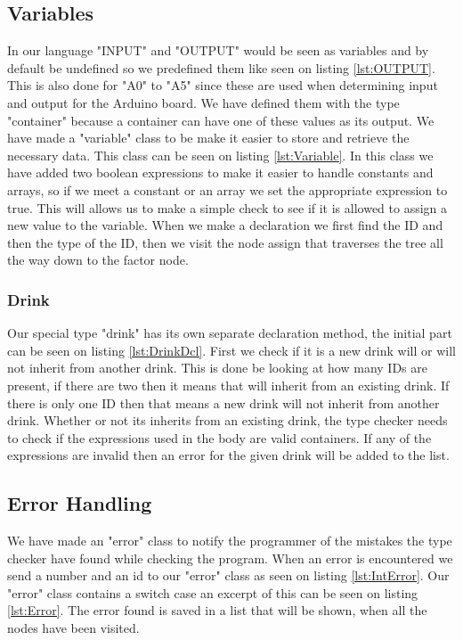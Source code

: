 \subsection*{Variables}
In our language "INPUT" and "OUTPUT" would be seen as variables and by default be undefined so we predefined them like seen on listing \ref{lst:OUTPUT}. This is also done for "A0" to "A5" since these are used when determining input and output for the Arduino board. We have defined them with the type "container" because a container can have one of these values as its output.
We have made a "variable" class to be make it easier to store and retrieve the necessary data. This class can be seen on listing \ref{lst:Variable}. In this class we have added two boolean expressions to make it easier to handle constants and arrays, so if we meet a constant or an array we set the appropriate expression to true. This will allows us to make a simple check to see if it is allowed to assign a new value to the variable.
When we make a declaration we first find the ID and then the type of the ID, then we visit the node assign that traverses the tree all the way down to the factor node.

\subsubsection*{Drink}
Our special type "drink" has its own separate declaration method, the initial part can be seen on listing \ref{lst:DrinkDcl}. First we check if it is a new drink will or will not inherit from another drink. This is done be looking at how many IDs are present, if there are two then it means that will inherit from an existing drink. If there is only one ID then that means a new drink will not inherit from another drink.
Whether or not its inherits from an existing drink, the type checker needs to check if the expressions used in the body are valid containers. If any of the expressions are invalid then an error for the given drink will be added to the list.

\subsection*{Error Handling}
We have made an "error" class to notify the programmer of the mistakes the type checker have found while checking the program. When an error is encountered we send a number and an id to our "error" class as seen on listing \ref{lst:IntError}.
Our "error" class contains a switch case an excerpt of this can be seen on listing \ref{lst:Error}. The error found is saved in a list that will be shown, when all the nodes have been visited.
